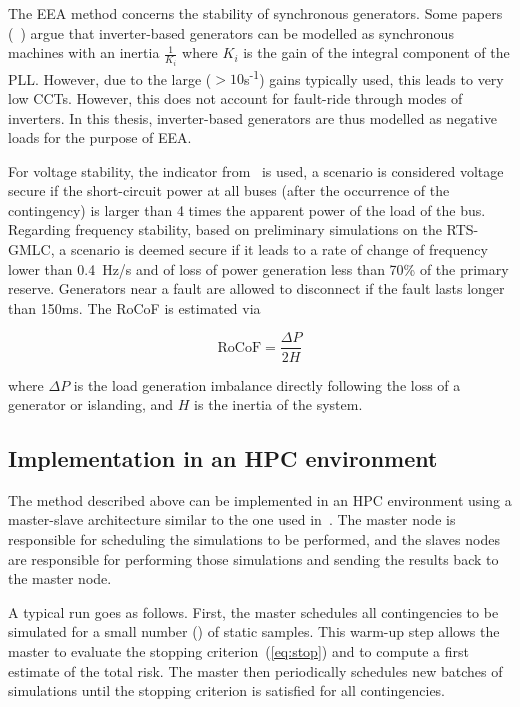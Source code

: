 The EEA method concerns the stability of synchronous generators. Some papers (\eg~\cite{ScreeningPLL}) argue that inverter-based generators can be modelled as synchronous machines with an inertia \(\frac{1}{K_i}\) where \(K_i\) is the gain of the integral component of the PLL. However, due to the large (\(>10\)s\textsuperscript{-1}) gains typically used, this leads to very low CCTs. However, this does not account for fault-ride through modes of inverters. In this thesis, inverter-based generators are thus modelled as negative loads for the purpose of EEA.

For voltage stability, the indicator from~\cite{VoltageScreeningMachowski} is used, \ie a scenario is considered voltage secure if the short-circuit power at all buses (after the occurrence of the contingency) is larger than 4 times the apparent power of the load of the bus. Regarding frequency stability, based on preliminary simulations on the RTS-GMLC, a scenario is deemed secure if it leads to a rate of change of frequency lower than 0.4~Hz/s and of loss of power generation less than 70\% of the primary reserve. Generators near a fault are allowed to disconnect if the fault lasts longer than 150ms. The RoCoF is estimated via

\begin{equation}
\text{RoCoF} = \frac{\Delta P}{2 H}
\end{equation}

\noindent where \(\Delta P\) is the load generation imbalance directly following the loss of a generator or islanding, and \(H\) is the inertia of the system.


\subsection{Implementation in an HPC environment}
\label{sec:HPC}

The method described above can be implemented in an HPC environment using a master-slave architecture similar to the one used in~\cite{EurostagHPC}. The master node is responsible for scheduling the simulations to be performed, and the slaves nodes are responsible for performing those simulations and sending the results back to the master node.

A typical run goes as follows. First, the master schedules all contingencies to be simulated for a small number () of static samples. This warm-up step allows the master to evaluate the stopping criterion~(\ref{eq:stop}) and to compute a first estimate of the total risk. The master then periodically schedules new batches of simulations until the stopping criterion is satisfied for all contingencies.

